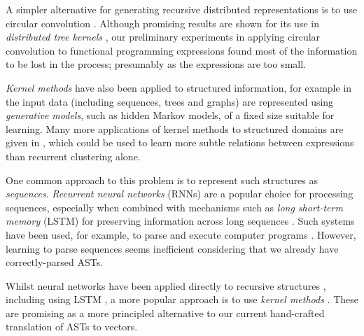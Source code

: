 A simpler alternative for generating recursive distributed representations is to
use circular convolution \cite{conf/ijcai/Plate91}. Although promising results
are shown for its use in \emph{distributed tree kernels}
\cite{zanzotto2012distributed}, our preliminary experiments in applying
circular convolution to functional programming expressions found most of the
information to be lost in the process; presumably as the expressions are too
small.

\emph{Kernel methods} have also been applied to structured information, for
example in \cite{Gartner2003} the input data (including sequences, trees and
graphs) are represented using \emph{generative models}, such as hidden Markov
models, of a fixed size suitable for learning. Many more applications of kernel
methods to structured domains are given in \cite{bakir2007predicting}, which
could be used to learn more subtle relations between expressions than recurrent
clustering alone.


 One common approach to this problem is
to represent such structures as \emph{sequences}. \emph{Recurrent neural
  networks} (RNNs) are a popular choice for processing sequences, especially
when combined with mechanisms such as \emph{long short-term memory} (LSTM) for
preserving information across long sequences \cite{hochreiter1997long}. Such
systems have been used, for example, to parse and execute computer programs
\cite{zaremba2014learning}. However, learning to parse sequences seems
inefficient considering that we already have correctly-parsed ASTs.

Whilst neural networks have been applied directly to recursive structures
\cite{goller1996learning}, including using LSTM \cite{zhu2015long}, a more
popular approach is to use \emph{kernel methods}
\cite{bakir2007predicting}. These are promising as a more principled alternative
to our current hand-crafted translation of ASTs to vectors.

